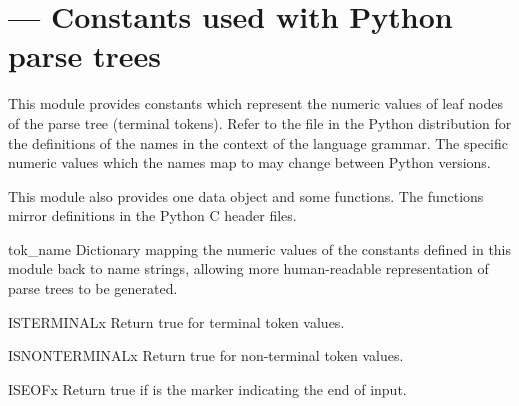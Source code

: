 \section{ ---
         Constants used with Python parse trees}



This module provides constants which represent the numeric values of
leaf nodes of the parse tree (terminal tokens).  Refer to the file
 in the Python distribution for the definitions
of the names in the context of the language grammar.  The specific
numeric values which the names map to may change between Python
versions.

This module also provides one data object and some functions.  The
functions mirror definitions in the Python C header files.



\begin{datadesc}{tok_name}
Dictionary mapping the numeric values of the constants defined in this
module back to name strings, allowing more human-readable
representation of parse trees to be generated.
\end{datadesc}

\begin{funcdesc}{ISTERMINAL}{x}
Return true for terminal token values.
\end{funcdesc}

\begin{funcdesc}{ISNONTERMINAL}{x}
Return true for non-terminal token values.
\end{funcdesc}

\begin{funcdesc}{ISEOF}{x}
Return true if  is the marker indicating the end of input.
\end{funcdesc}


\begin{seealso}
\end{seealso}
